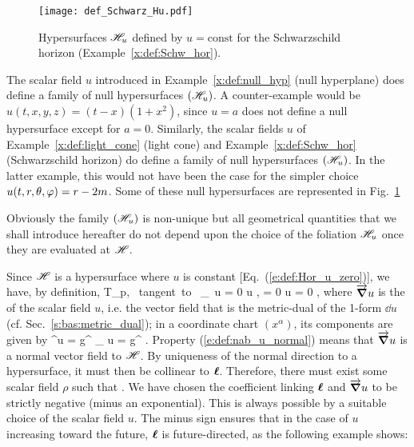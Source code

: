 \begin{figure}
\centerline{\texttt{[image: def\_Schwarz\_Hu.pdf]}}
\caption[]{\label{f:def:Schwarz_Hu} \footnotesize
Hypersurfaces $\mathscr{H}_u$ defined by $u=\mathrm{const}$ for
the Schwarzschild horizon (Example~\ref{x:def:Schw_hor}).}
\end{figure}



\begin{example}
The scalar field $u$ introduced in Example~\ref{x:def:null_hyp}
(null hyperplane) does define a family of null hypersurfaces
$(\mathscr{H}_u)$. A counter-example would be $u(t,x,y,z)=(t-x)(1+x^2)$, since
$u=a$ does not define a null hypersurface except for $a=0$.
Similarly, the scalar fields $u$ of
Example~\ref{x:def:light_cone} (light cone)
and Example~\ref{x:def:Schw_hor} (Schwarzschild horizon)
do define a family of null
hypersurfaces $(\mathscr{H}_u)$.
In the latter example, this would not have been the
case for the simpler choice $u(t,r,\theta,\varphi)  = r - 2m$.
Some of these null hypersurfaces are represented in Fig.~\ref{f:def:Schwarz_Hu}
\end{example}

Obviously the family $(\mathscr{H}_u)$ is non-unique but all geometrical
quantities that we shall introduce hereafter do not depend upon the choice
of the foliation $\mathscr{H}_u$ once they are evaluated at $\mathscr{H}$.

Since $\mathscr{H}$ is a hypersurface where $u$ is constant [Eq.~(\ref{e:def:Hor_u_zero})],
we have, by definition,
\be
    \forall {}\in T_p\M,\quad {} \mbox{\ tangent to\ }\Hor
    \iff  \wnab_{}\,  u = 0
    \iff  \langle \dd u ,  \rangle = 0
    \iff  \vw{\nabla} u \cdot {} = 0 ,   \label{e:def:nab_u_normal}
\ee
where $\overrightarrow{\bm{\nabla}} u$ is the  of the scalar field $u$,
i.e. the vector field that is the metric-dual of the 1-form $\dd u$
(cf. Sec.~\ref{s:bas:metric_dual});
in a coordinate chart $(x^\alpha)$, its components are given by
\be \label{e:def:nab_up_u}
    \nabla^\alpha u = g^{\alpha\mu} \nabla_{\mu} u = g^{\alpha\mu}  .
\ee
Property (\ref{e:def:nab_u_normal}) means that $\overrightarrow{\bm{\nabla}} u$ is
a normal vector field to $\mathscr{H}$. By uniqueness of the normal direction to a hypersurface, it
must then be collinear to $\bm{\ell}$. Therefore, there must exist some scalar
field $\rho$ such that
\be \label{e:def:wl_rho_u}
     .
\ee
We have chosen the
coefficient linking $\bm{\ell}$ and $\overrightarrow{\bm{\nabla}} u $ to be strictly negative
(minus an exponential). This is always possible by a suitable
choice of the scalar field $u$. The minus sign ensures that in the case
of $u$ increasing toward the future, $\bm{\ell}$ is future-directed,
as the following example shows:

